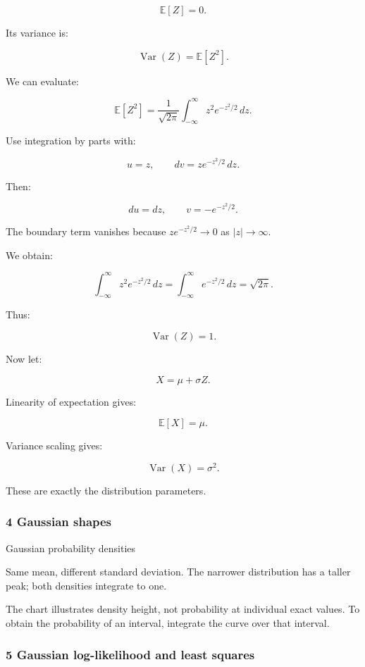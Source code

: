 \[
 \mathbb E[Z]=0.
\]

Its variance is:

\[
 \operatorname{Var}(Z)=\mathbb E[Z^2].
\]

We can evaluate:

\[
 \mathbb E[Z^2] = \frac1{\sqrt{2\pi}} \int_{-\infty}^{\infty}z^2e^{-z^2/2}\,dz.
\]

Use integration by parts with:

\[
 u=z,\qquad dv=ze^{-z^2/2}\,dz.
\]

Then:

\[
 du=dz, \qquad v=-e^{-z^2/2}.
\]

The boundary term vanishes because \(ze^{-z^2/2}\to0\) as \(|z|\to\infty\).

We obtain:

\[
 \int_{-\infty}^{\infty}z^2e^{-z^2/2}\,dz = \int_{-\infty}^{\infty}e^{-z^2/2}\,dz =\sqrt{2\pi}.
\]

Thus:

\[
 \boxed{\operatorname{Var}(Z)=1}.
\]

Now let:

\[
 X=\mu+\sigma Z.
\]

Linearity of expectation gives:

\[
 \mathbb E[X]=\mu.
\]

Variance scaling gives:

\[
 \operatorname{Var}(X)=\sigma^2.
\]

These are exactly the distribution parameters.

\subsubsection{4 Gaussian shapes}\label{02-foundations-ii-ch023-gaussian-shapes}

\hypertarget{02-foundations-ii-ch023-gaussian-shapes}{}

Gaussian probability densities

Same mean, different standard deviation. The narrower distribution has a taller peak; both densities integrate to one.

The chart illustrates density height, not probability at individual exact values. To obtain the probability of an interval, integrate the curve over that interval.

\subsubsection{5 Gaussian log-likelihood and least squares}\label{02-foundations-ii-ch023-gaussian-log-likelihood-and-least-squares}


